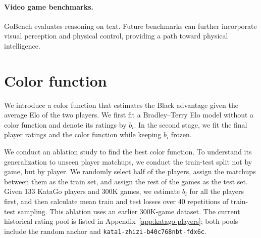 \documentclass{article}
\begin{document}
\paragraph{Video game benchmarks.}
GoBench evaluates reasoning on text.
Future benchmarks can further incorporate visual perception
and physical control, providing a path toward physical intelligence.


\clearpage



\clearpage
\appendix
\small

\section{Color function}
We introduce a color function that estimates the Black advantage given the average Elo of the two players.
We first fit a Bradley--Terry Elo model without a color function and denote its
ratings by $b_i$. In the second stage, we fit the final player ratings and the color function while keeping $b_i$ frozen.

We conduct an ablation study to find the best color function.
To understand its generalization to unseen player matchups, we conduct the train-test split not by game, but by player.
We randomly select half of the players, assign the matchups between them as the train set, and assign the rest of the games as the test set.
Given 133 KataGo players and 300K games, we estimate $b_i$ for all the players first,
and then calculate mean train and test losses over 40 repetitions of train-test sampling.
This ablation uses an earlier 300K-game dataset. The current historical rating pool is listed in
Appendix~\ref{app:katago-players}; both pools include the random anchor and
\texttt{kata1-zhizi-b40c768nbt-fdx6c}.
\end{document}
